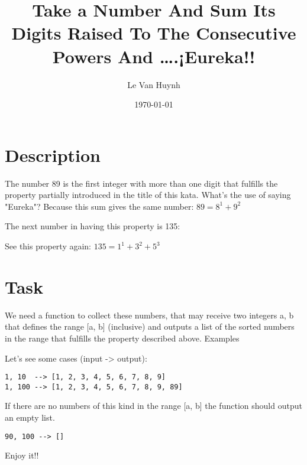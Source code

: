 \documentclass[11pt]{article}
\author{Le Van Huynh}
\date{\today}
\title{Take a Number And Sum Its Digits Raised To The Consecutive Powers And \ldots{}.¡Eureka!!}
\begin{document}
\maketitle
\tableofcontents


\section{Description}
\label{sec:orgb19cd97}

The number 89 is the first integer with more than one digit that fulfills the property partially introduced in the title of this kata. What's the use of saying "Eureka"? Because this sum gives the same number: \(89=8^1 + 9^2\)

The next number in having this property is 135:

See this property again: \(135= 1^1 + 3^2 + 5^3\)

\section{Task}
\label{sec:org3dd723f}

We need a function to collect these numbers, that may receive two integers a, b that defines the range [a, b] (inclusive) and outputs a list of the sorted numbers in the range that fulfills the property described above.
Examples

Let's see some cases (input -> output):

\begin{verbatim}
1, 10  --> [1, 2, 3, 4, 5, 6, 7, 8, 9]
1, 100 --> [1, 2, 3, 4, 5, 6, 7, 8, 9, 89]
\end{verbatim}

If there are no numbers of this kind in the range [a, b] the function should output an empty list.

\begin{verbatim}
90, 100 --> []
\end{verbatim}


Enjoy it!!
\end{document}
